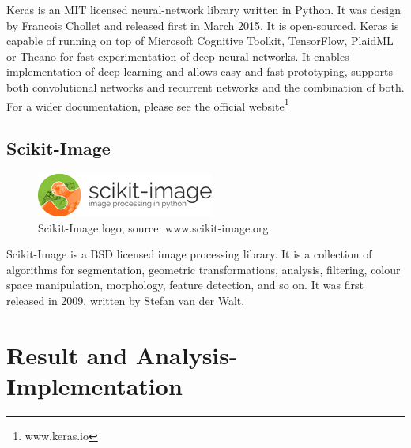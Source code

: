 Keras is an MIT licensed neural-network library written in Python. It was design by Francois Chollet and released first in March 2015. It is open-sourced. Keras is capable of running on top of Microsoft Cognitive Toolkit, TensorFlow, PlaidML or Theano for fast experimentation of deep neural networks. It enables implementation of deep learning and allows easy and 
fast prototyping, supports both convolutional networks and recurrent networks and the combination of both. For a wider documentation, please see the official website\footnote{www.keras.io}

\section{ Scikit-Image}
\begin{figure}[H]
    \centering
    \includegraphics[width=0.7\linewidth]{images/Scikit-image.png}
     \caption{Scikit-Image logo, source: www.scikit-image.org}
  \end{figure}

Scikit-Image is a BSD licensed image processing library. It is a collection of algorithms for segmentation, 
geometric transformations, analysis, filtering, colour space manipulation, morphology, feature detection, and so on. It was first released in 2009, written by Stefan van der Walt.
\cleardoublepage

\chapter{Result and Analysis-Implementation}\label{Implementation}
